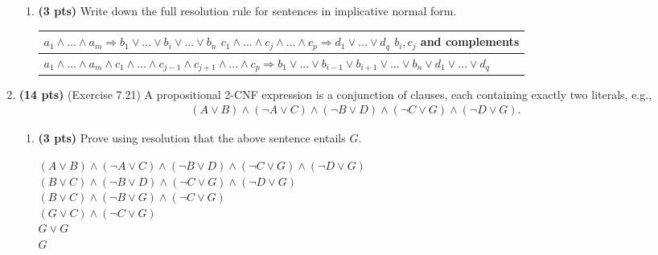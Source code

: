 \documentclass{article}
\makeatletter
\newcommand{\logicarg}[2]{%
  \begin{tabular}[t]{@{}l@{}}
    #1 \\ \hline #2
  \end{tabular}%
}
\makeatother
\begin{document}
\begin{enumerate}
\begin{enumerate}[label=($\alph*$)]


    \item \textbf{(3 pts)} Write down the full resolution rule for sentences in implicative normal form.

    \color{blue}
        \logicarg{$a_1 \wedge ... \wedge a_m \Rightarrow b_1 \vee ... \vee b_i \vee ... \vee b_n$ \quad $c_1 \wedge ... \wedge c_j \wedge ... \wedge c_p \Rightarrow d_1 \vee ... \vee d_q$ \quad $b_i, c_j$ and complements}
        {$a_1 \wedge ... \wedge a_m \wedge c_1 \wedge ... \wedge c_{j-1} \wedge c_{j+1} \wedge ... \wedge c_p \Rightarrow b_1 \vee ... \vee b_{i-1} \vee b_{i+1} \vee ... \vee b_n \vee d_1 \vee ... \vee d_q$}
    \color{black}

    
    \end{enumerate}



\item \textbf{(14 pts)} (Exercise 7.21) A propositional 2-CNF expression is a conjunction of clauses, each containing exactly two literals, e.g.,
\begin{gather*}
    (A \vee B) \wedge (\neg A \vee C) \wedge (\neg B \vee D) \wedge (\neg C \vee G) \wedge (\neg D \vee G).
\end{gather*}

    \begin{enumerate}[label=($\alph*$)]


    \item \textbf{(3 pts)} Prove using resolution that the above sentence entails $G$.

    \color{blue}
        $(A \vee B) \wedge (\neg A \vee C) \wedge (\neg B \vee D) \wedge (\neg C \vee G) \wedge (\neg D \vee G)$\\
        $(B \vee C) \wedge (\neg B \vee D) \wedge (\neg C \vee G) \wedge (\neg D \vee G)$\\
        $(B \vee C) \wedge (\neg B \vee G) \wedge (\neg C \vee G)$\\
        $(G \vee C) \wedge (\neg C \vee G)$\\
        $G \vee G$\\
        $G$
    \color{black}


\end{enumerate}
\end{enumerate}
\end{document}
